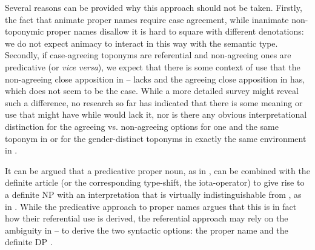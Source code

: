 \documentclass[output=paper,colorlinks,citecolor=brown]{langscibook}
\begin{document}
Several reasons can be provided why this approach should not be taken. Firstly, the fact that animate proper names require case agreement, while inanimate non-toponymic proper names disallow it is hard to square with different denotations: we do not expect animacy to interact in this way with the semantic type. Secondly, if case-agreeing toponyms are referential and non-agreeing ones are predicative (or \textit{vice versa}), we expect that there is some context of use that the non-agreeing close apposition in -- lacks and the agreeing close apposition in  has, which does not seem to be the case. While a more detailed survey might reveal such a difference, no research so far has indicated that there is some meaning or use that  might have while  would lack it, nor is there any obvious interpretational distinction for the agreeing vs. non-agreeing options for one and the same toponym in  or for the gender-distinct toponyms in exactly the same environment in .

\ea\label{mat:ex:vgorodeMoskve-vgorodeGagry}
\z
\z

\noindent It can be argued that a predicative proper noun, as in , can be combined with the definite article (or the corresponding type-shift, the iota-operator) to give rise to a definite NP with an interpretation that is virtually indistinguishable from , as in . While the predicative approach to proper names argues that this is in fact how their referential use is derived, the referential approach may rely on the ambiguity in -- to derive the two syntactic options: the proper name  and the definite DP .
\end{document}
